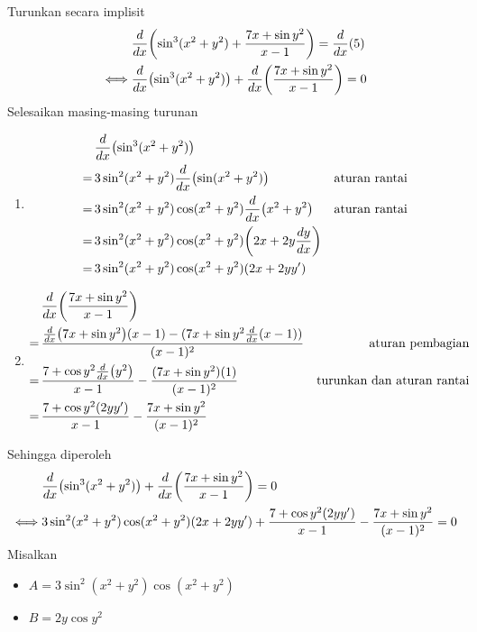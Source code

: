 \begin{enumerate}[leftmargin=*, label={\arabic*}.]
\begin{enumerate}[label={\alph*}.]
    Turunkan secara implisit 
    \begin{align*}
        &\drv{x}{\sin^{3}(x^2+y^2)+\frac{7x+\sin y^{2}}{x-1}}=\drv{x}{5}\\
        \iff &\drv{x}{\sin^{3}(x^2+y^2)}+\drv{x}{\frac{7x+\sin y^{2}}{x-1}} = 0
    \end{align*}
    Selesaikan masing-masing turunan
        \begin{enumerate}[label={\arabic*})]
        \item \begin{align*}
            &\drv{x}{\sin^{3}(x^2+y^2)}\\
            =\,&3\sin^{2}(x^{2}+y^{2})\drv{x}{\sin(x^{2}+y^{2})}
            &\text{aturan rantai}\\
            =\,&3\sin^{2}(x^{2}+y^{2})\cos(x^{2}+y^{2})\drv{x}{x^{2}+y^{2}}
            &\text{aturan rantai}\\
            =\,&3\sin^{2}(x^{2}+y^{2})\cos(x^{2}+y^{2})\brk*{2x+2y\frac{dy}{dx}}\\
            =\,&3\sin^{2}(x^{2}+y^{2})\cos(x^{2}+y^{2})(2x+2yy')
        \end{align*}
        \item \begin{align*}
            &\drv{x}{\frac{7x+\sin y^{2}}{x-1}} \\
            =\,&\frac{\drv{x}{7x+\sin y^{2}}(x-1)-(7x+\sin y^{2}\drv{x}{x-1})}{(x-1)^{2}}
            &\text{aturan pembagian}\\
            =\,& \frac{7+\cos y^{2}\drv{x}{y^{2}}}{x-1}-\frac{(7x+\sin y^{2})(1)}{(x-1)^{2}}
            &\text{turunkan dan aturan rantai}\\
            =\,&\frac{7+\cos y^{2}(2yy')}{x-1}-\frac{7x+\sin y^{2}}{(x-1)^{2}}
        \end{align*}
        \end{enumerate}
    Sehingga diperoleh 
    \begin{align*}
        &\drv{x}{\sin^{3}(x^2+y^2)}+\drv{x}{\frac{7x+\sin y^{2}}{x-1}} = 0\\
        \iff &3\sin^{2}(x^{2}+y^{2})\cos(x^{2}+y^{2})(2x+2yy') + 
        \frac{7+\cos y^{2}(2yy')}{x-1}-\frac{7x+\sin y^{2}}{(x-1)^{2}} = 0
    \end{align*}
    Misalkan 
        \begin{itemize}
        \item $A = 3\sin^{2}(x^{2}+y^{2})\cos(x^{2}+y^{2})$
        \item $B = 2y\cos y^{2}$

\end{itemize}
\end{enumerate}
\end{enumerate}
